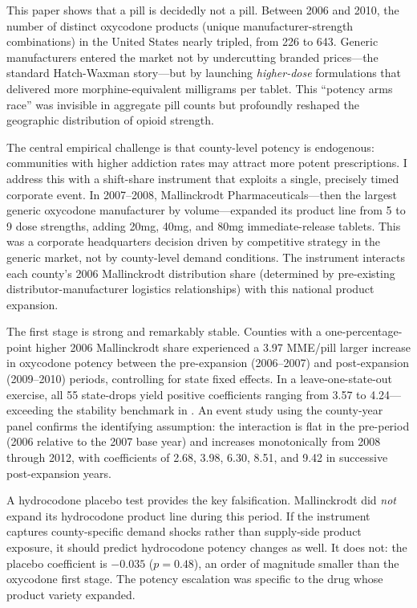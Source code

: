 \documentclass[12pt]{article}
\begin{document}
This paper shows that a pill is decidedly not a pill. Between 2006 and 2010, the number of distinct oxycodone products (unique manufacturer-strength combinations) in the United States nearly tripled, from 226 to 643. Generic manufacturers entered the market not by undercutting branded prices---the standard Hatch-Waxman story---but by launching \emph{higher-dose} formulations that delivered more morphine-equivalent milligrams per tablet. This ``potency arms race'' was invisible in aggregate pill counts but profoundly reshaped the geographic distribution of opioid strength.

The central empirical challenge is that county-level potency is endogenous: communities with higher addiction rates may attract more potent prescriptions. I address this with a shift-share instrument that exploits a single, precisely timed corporate event. In 2007--2008, Mallinckrodt Pharmaceuticals---then the largest generic oxycodone manufacturer by volume---expanded its product line from 5 to 9 dose strengths, adding 20mg, 40mg, and 80mg immediate-release tablets. This was a corporate headquarters decision driven by competitive strategy in the generic market, not by county-level demand conditions. The instrument interacts each county's 2006 Mallinckrodt distribution share (determined by pre-existing distributor-manufacturer logistics relationships) with this national product expansion.

The first stage is strong and remarkably stable. Counties with a one-percentage-point higher 2006 Mallinckrodt share experienced a 3.97 MME/pill larger increase in oxycodone potency between the pre-expansion (2006--2007) and post-expansion (2009--2010) periods, controlling for state fixed effects. In a leave-one-state-out exercise, all 55 state-drops yield positive coefficients ranging from 3.57 to 4.24---exceeding the stability benchmark in \citet{young2022consistency}. An event study using the county-year panel confirms the identifying assumption: the interaction is flat in the pre-period (2006 relative to the 2007 base year) and increases monotonically from 2008 through 2012, with coefficients of 2.68, 3.98, 6.30, 8.51, and 9.42 in successive post-expansion years.

A hydrocodone placebo test provides the key falsification. Mallinckrodt did \emph{not} expand its hydrocodone product line during this period. If the instrument captures county-specific demand shocks rather than supply-side product exposure, it should predict hydrocodone potency changes as well. It does not: the placebo coefficient is $-0.035$ ($p = 0.48$), an order of magnitude smaller than the oxycodone first stage. The potency escalation was specific to the drug whose product variety expanded.
\end{document}
